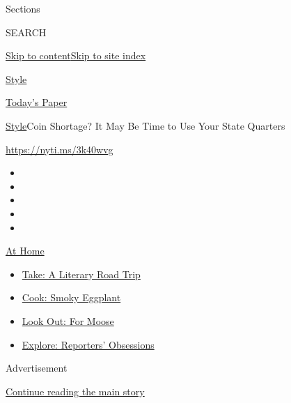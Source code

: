 Sections

SEARCH

\protect\hyperlink{site-content}{Skip to
content}\protect\hyperlink{site-index}{Skip to site index}

\href{https://www.nytimes.com/section/style}{Style}

\href{https://myaccount.nytimes.com/auth/login?response_type=cookie\&client_id=vi}{}

\href{https://www.nytimes.com/section/todayspaper}{Today's Paper}

\href{/section/style}{Style}\textbar{}Coin Shortage? It May Be Time to
Use Your State Quarters

\url{https://nyti.ms/3k40wvg}

\begin{itemize}
\item
\item
\item
\item
\item
\end{itemize}

\href{https://www.nytimes.com/spotlight/at-home?action=click\&pgtype=Article\&state=default\&region=TOP_BANNER\&context=at_home_menu}{At
Home}

\begin{itemize}
\tightlist
\item
  \href{https://www.nytimes.com/2020/07/28/books/time-for-a-literary-road-trip.html?action=click\&pgtype=Article\&state=default\&region=TOP_BANNER\&context=at_home_menu}{Take:
  A Literary Road Trip}
\item
  \href{https://www.nytimes.com/2020/07/29/magazine/bored-with-your-home-cooking-some-smoky-eggplant-will-fix-that.html?action=click\&pgtype=Article\&state=default\&region=TOP_BANNER\&context=at_home_menu}{Cook:
  Smoky Eggplant}
\item
  \href{https://www.nytimes.com/2020/07/27/travel/moose-michigan-isle-royale.html?action=click\&pgtype=Article\&state=default\&region=TOP_BANNER\&context=at_home_menu}{Look
  Out: For Moose}
\item
  \href{https://www.nytimes.com/interactive/2020/at-home/even-more-reporters-editors-diaries-lists-recommendations.html?action=click\&pgtype=Article\&state=default\&region=TOP_BANNER\&context=at_home_menu}{Explore:
  Reporters' Obsessions}
\end{itemize}

Advertisement

\protect\hyperlink{after-top}{Continue reading the main story}

